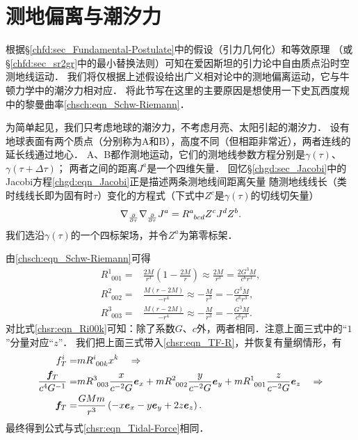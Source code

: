 \section{测地偏离与潮汐力}\label{chsch:sec_GDTF}
根据\S\ref{chfd:sec_Fundamental-Postulate}中的假设（引力几何化）和等效原理
（或\S\ref{chfd:sec_sr2gr}中的最小替换法则）可知在爱因斯坦的引力论中自由质点沿时空测地线运动．
我们将仅根据上述假设给出广义相对论中的测地偏离运动，它与牛顿力学中的潮汐力相对应．
将此节写在这里的主要原因是想使用一下史瓦西度规中的黎曼曲率\eqref{chsch:eqn_Schw-Riemann}．

为简单起见，我们只考虑地球的潮汐力，不考虑月亮、太阳引起的潮汐力．
设有地球表面有两个质点（分别称为A和B），高度不同（但相距非常近），两者连线的延长线通过地心．
A、B都作测地运动，它们的测地线参数方程分别是$\gamma(\tau)$、$\gamma(\tau+\Delta\tau)$；
两者之间的距离$J^a$是一个四维矢量．
回忆\S\ref{chgd:sec_Jacobi}中的Jacobi方程\eqref{chgd:eqn_Jacobi}正是描述两条测地线间距离矢量
随测地线线长（类时线线长即为固有时$\tau$）变化的方程式（下式中$Z^c$是$\gamma(\tau)$的切线切矢量）
\begin{equation}
	\nabla_{\frac{\partial}{\partial \tau}} \nabla_{\frac{\partial}{\partial \tau}}{J}^a =
	R^{a}_{\hphantom{a} bcd} {Z}^c{J}^d {Z}^b. 
\end{equation}
我们选沿$\gamma(\tau)$的一个四标架场，并令$Z^a$为第零标架．


由\eqref{chsch:eqn_Schw-Riemann}可得
\begin{align}
		R^1_{\phantom{1}001}=&\frac{2 M}{r^3}\left(1-\frac{2M}{r}\right)\approx \frac{2 M}{r^3}
		=\frac{2 G^3 M}{c^6 r^3} ,\\
		R^2_{\phantom{1}002}=&\frac{M(r-2M)}{-r^4}\approx -\frac{M}{r^3}=-\frac{G^3 M}{c^6 r^3},\\ 
		R^3_{\phantom{1}003}=&\frac{M(r-2M)}{-r^4}\approx -\frac{M}{r^3}=-\frac{G^3 M}{c^6 r^3}.
\end{align}
对比式\eqref{chsr:eqn_Ri00k}可知：除了系数$G$、$c$外，两者相同．注意上面三式中的“$1$”分量对应“$z$”．
我们把上面三式带入\eqref{chsr:eqn_TF-R}，并恢复有量纲情形，有
\begin{align*}
	f^i_T = &  m R_{\hphantom{i}00k}^i x^k  \quad \Rightarrow \\
	\frac{\boldsymbol{f}_T}{c^4 G^{-1}} = & m R^3_{\phantom{3}003} \frac{x}{c^{-2}G}\boldsymbol{e}_x
	+m R^2_{\phantom{2}002} \frac{y}{c^{-2}G}\boldsymbol{e}_y
	+m R^1_{\phantom{1}001} \frac{z}{c^{-2}G}\boldsymbol{e}_z \quad \Rightarrow  \\
	\boldsymbol{f}_T = & \frac{G M m}{r^3} \left( -x \boldsymbol{e}_x -y \boldsymbol{e}_y+ 2z \boldsymbol{e}_z \right) .
\end{align*}
最终得到公式与式\eqref{chsr:eqn_Tidal-Force}相同．



